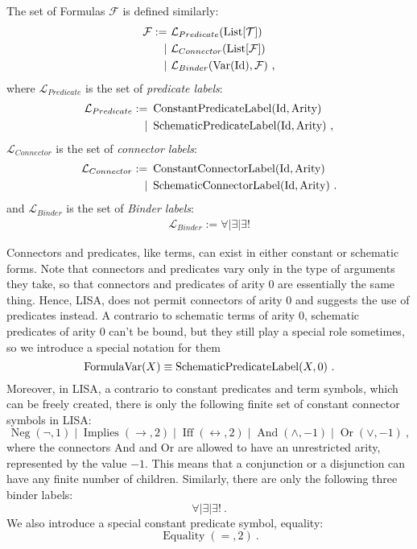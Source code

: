 \begin{defin}[Formulas]
  The set of Formulas $\mathcal{F}$ is defined similarly:
  \begin{align}
    \mathcal{F} := & ~\mathcal{L}_{Predicate}(\operatorname{List}[\mathcal{T}])                \\
    \mid           & ~\mathcal{L}_{Connector}(\operatorname{List}[\mathcal{F}])                \\
    \mid           & ~\mathcal{L}_{Binder}(\operatorname{Var}(\textnormal{Id}), \mathcal{F})~,
  \end{align}
  where $\mathcal{L}_{Predicate}$ is the set of \textit{predicate labels}:
  \begin{align}
    \mathcal{L}_{Predicate} := & ~\operatorname{ConstantPredicateLabel}(\textnormal{Id}, \textnormal{Arity})    \\
    \mid                       & ~\operatorname{SchematicPredicateLabel}(\textnormal{Id}, \textnormal{Arity})~,
  \end{align}
  $\mathcal{L}_{Connector}$ is the set of \textit{connector labels}:
  \begin{align}
    \mathcal{L}_{Connector} := & ~\operatorname{ConstantConnectorLabel}(\textnormal{Id}, \textnormal{Arity})    \\
    \mid                       & ~\operatorname{SchematicConnectorLabel}(\textnormal{Id}, \textnormal{Arity})~.
  \end{align}
  and $\mathcal{L}_{Binder}$ is the set of \textit{Binder labels}:
  \begin{align}
    \mathcal{L}_{Binder} := \forall \mid \exists \mid \exists!
  \end{align}
  
  Connectors and predicates, like terms, can exist in either constant or schematic forms. Note that connectors and predicates vary only in the type of arguments they take, so that connectors and predicates of arity 0 are essentially the same thing. Hence, LISA, does not permit connectors of arity 0 and suggests the use of predicates instead.
  A contrario to schematic terms of arity 0, schematic predicates of arity 0 can't be bound, but they still play a special role sometimes, so we introduce a special notation for them
  $$
  \operatorname{FormulaVar}(X) \equiv \operatorname{SchematicPredicateLabel}(X, 0)~.
  $$
  Moreover, in LISA, a contrario to constant predicates and term symbols, which can be freely created, there is only the following finite set of constant connector symbols in LISA:
  $$
    \operatorname{Neg}(\neg, 1)\mid \operatorname{Implies}(\rightarrow, 2)\mid \operatorname{Iff}(\leftrightarrow, 2)\mid \operatorname{And}(\land, -1)\mid \operatorname{Or}(\lor, -1)~,
  $$
  where the connectors And and Or are allowed to have an unrestricted arity, represented by the value $-1$. This means that a conjunction or a disjunction can have any finite number of children.
  Similarly, there are only the following three binder labels:
  $$
    \forall \mid \exists \mid \exists !~.
  $$
  We also introduce a special constant predicate symbol, equality:
  $$
    \operatorname{Equality}(=, 2)~.
  $$
\end{defin}

